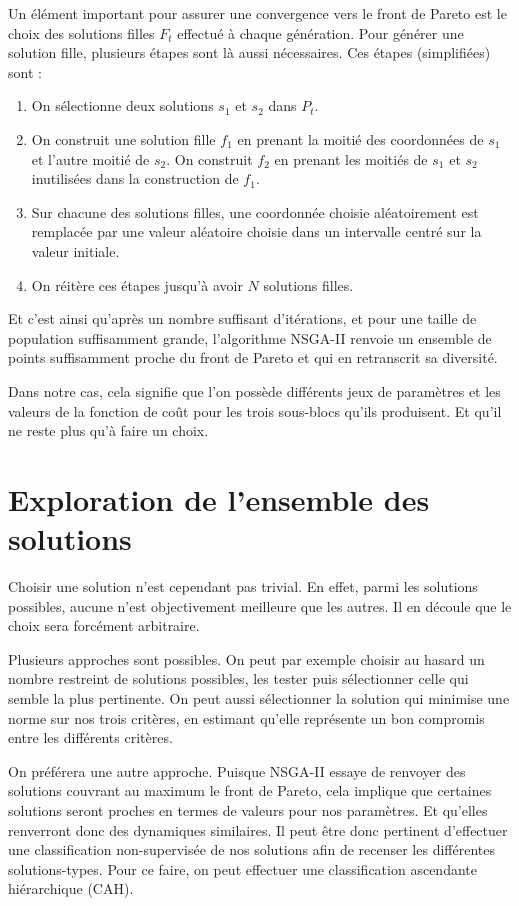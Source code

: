 Un élément important pour assurer une convergence vers le front de Pareto est le choix des solutions filles $F_t$ effectué à chaque génération.
Pour générer une solution fille, plusieurs étapes sont là aussi nécessaires.
Ces étapes (simplifiées) sont :
\begin{enumerate}
 \item On sélectionne deux solutions $s_1$ et $s_2$ dans $P_t$.
 \item On construit une solution fille $f_1$ en prenant la moitié des coordonnées de $s_1$ et l'autre moitié de $s_2$. 
 On construit $f_2$ en prenant les moitiés de $s_1$ et $s_2$ inutilisées dans la construction de $f_1$.
 \item Sur chacune des solutions filles, une coordonnée choisie aléatoirement est remplacée par une valeur aléatoire choisie dans un intervalle centré sur la valeur initiale.
 \item On réitère ces étapes jusqu'à avoir $N$ solutions filles.
\end{enumerate}


Et c'est ainsi qu'après un nombre suffisant d'itérations, et pour une taille de population suffisamment grande, l'algorithme NSGA-II renvoie un ensemble de points suffisamment proche du front de Pareto et qui en retranscrit sa diversité.


Dans notre cas, cela signifie que l'on possède différents jeux de paramètres et les valeurs de la fonction de coût pour les trois sous-blocs qu'ils produisent.
Et qu'il ne reste plus qu'à faire un choix.



\section{Exploration de l'ensemble des solutions}


Choisir une solution n'est cependant pas trivial.
En effet, parmi les solutions possibles, aucune n'est objectivement meilleure que les autres.
Il en découle que le choix sera forcément arbitraire.

Plusieurs approches sont possibles.
On peut par exemple choisir au hasard un nombre restreint de solutions possibles, les tester puis sélectionner celle qui semble la plus pertinente.
On peut aussi sélectionner la solution qui minimise une norme sur nos trois critères, en estimant qu'elle représente un bon compromis entre les différents critères.

On préférera une autre approche. 
Puisque NSGA-II essaye de renvoyer des solutions couvrant au maximum le front de Pareto, cela implique que certaines solutions seront proches en termes de valeurs pour nos paramètres.
Et qu'elles renverront donc des dynamiques similaires.
Il peut être donc pertinent d'effectuer une classification non-supervisée de nos solutions afin de recenser les différentes solutions-types.
Pour ce faire, on peut effectuer une classification ascendante hiérarchique (CAH).

